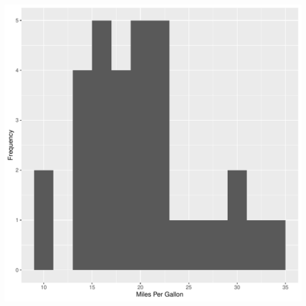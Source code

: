 \documentclass[a4paper,12pt]{article}\usepackage[]{graphicx}\usepackage[]{xcolor}
\makeatletter
\def\maxwidth{ %
  \ifdim\Gin@nat@width>\linewidth
    \linewidth
  \else
    \Gin@nat@width
  \fi
}
\makeatother
\begin{document}
\includegraphics[width=\maxwidth]{figure/unnamed-chunk-1-3} 
\end{document}
